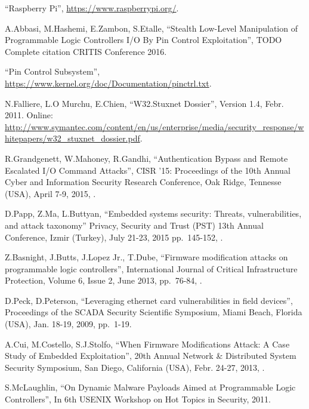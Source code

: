 \begin{thebibliography}{99}

``Raspberry Pi'',
\url{https://www.raspberrypi.org/}.

A.Abbasi, M.Hashemi, E.Zambon, S.Etalle,
``Stealth Low-Level Manipulation of Programmable Logic Controllers I/O By Pin Control Exploitation'',
TODO Complete citation CRITIS Conference 2016.

``Pin Control Subsystem'',
\url{https://www.kernel.org/doc/Documentation/pinctrl.txt}.

N.Falliere, L.O Murchu, E.Chien,
``W32.Stuxnet  Dossier'',
Version 1.4, Febr. 2011.
Online: \url{http://www.symantec.com/content/en/us/enterprise/media/security_response/whitepapers/w32_stuxnet_dossier.pdf}.

R.Grandgenett, W.Mahoney, R.Gandhi,
``Authentication Bypass and Remote Escalated I/O Command Attacks'',
CISR '15: Proceedings of the 10th Annual Cyber and Information Security Research Conference,
Oak Ridge, Tennesse (USA), April 7-9, 2015,
.

D.Papp, Z.Ma, L.Buttyan,
``Embedded systems security: Threats, vulnerabilities, and attack taxonomy''
Privacy, Security and Trust (PST) 13th Annual Conference,
Izmir (Turkey), July 21-23, 2015
pp.\ 145-152,
.

Z.Basnight, J.Butts, J.Lopez Jr., T.Dube,
``Firmware modification attacks on programmable logic controllers'',
International Journal of Critical Infrastructure Protection,
Volume 6, Issue 2, June 2013,
pp.\ 76-84,
.

D.Peck, D.Peterson,
``Leveraging ethernet card vulnerabilities in field devices'',
Proceedings of the SCADA Security Scientific Symposium,
Miami Beach, Florida (USA), Jan. 18-19, 2009,
pp.\ 1-19.

A.Cui, M.Costello, S.J.Stolfo,
``When Firmware Modifications Attack: A Case Study of Embedded Exploitation'',
20th Annual Network \& Distributed System Security Symposium,
San Diego, California (USA), Febr. 24-27, 2013,
.

S.McLaughlin,
``On Dynamic Malware Payloads Aimed at Programmable Logic Controllers'',
In 6th USENIX Workshop on Hot Topics in Security,
2011.


\end{thebibliography}
